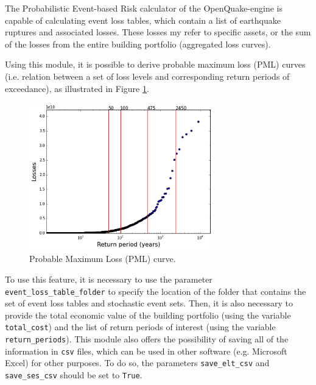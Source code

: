 The Probabilistic Event-based Risk calculator \citep{SilvaEtAl2014a} of the OpenQuake-engine is capable of calculating event loss tables, which contain a list of earthquake ruptures and associated losses. These losses my refer to specific assets, or the sum of the losses from the entire building portfolio (aggregated loss curves).

Using this module, it is possible to derive probable maximum loss (PML) curves (i.e. relation between a set of loss levels and corresponding return periods of exceedance), as illustrated in Figure \ref{fig:pml}.

\begin{figure}[htb]
  \centering
      \includegraphics[width=8cm]{figures/pml_example.png}
  \caption{Probable Maximum Loss (PML) curve.}
  \label{fig:pml}
\end{figure}

To use this feature, it is necessary to use the parameter \verb=event_loss_table_folder= to specify the location of the folder that contains the set of event loss tables and stochastic event sets. Then, it is also necessary to provide the total economic value of the building portfolio (using the variable \verb=total_cost=) and the list of return periods of interest (using the variable \verb=return_periods=). This module also offers the possibility of saving all of the information in \verb=csv= files, which can be used in other software (e.g. Microsoft Excel) for other purposes. To do so, the parameters \verb=save_elt_csv= and \verb=save_ses_csv= should be set to \verb=True=.